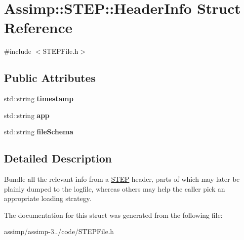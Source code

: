 \hypertarget{struct_assimp_1_1_s_t_e_p_1_1_header_info}{\section{Assimp\+:\+:S\+T\+E\+P\+:\+:Header\+Info Struct Reference}
\label{struct_assimp_1_1_s_t_e_p_1_1_header_info}
}


{\ttfamily \#include $<$S\+T\+E\+P\+File.\+h$>$}

\subsection*{Public Attributes}
\begin{DoxyCompactItemize}
\item 
\hypertarget{struct_assimp_1_1_s_t_e_p_1_1_header_info_a1f8c559854a4c72093288d3a49924643}{std\+::string {\bfseries timestamp}}\label{struct_assimp_1_1_s_t_e_p_1_1_header_info_a1f8c559854a4c72093288d3a49924643}

\item 
\hypertarget{struct_assimp_1_1_s_t_e_p_1_1_header_info_a11cff7415618244f9fd447878db72f6c}{std\+::string {\bfseries app}}\label{struct_assimp_1_1_s_t_e_p_1_1_header_info_a11cff7415618244f9fd447878db72f6c}

\item 
\hypertarget{struct_assimp_1_1_s_t_e_p_1_1_header_info_a7ba02d09159bb581394c6eb671722539}{std\+::string {\bfseries file\+Schema}}\label{struct_assimp_1_1_s_t_e_p_1_1_header_info_a7ba02d09159bb581394c6eb671722539}

\end{DoxyCompactItemize}


\subsection{Detailed Description}
Bundle all the relevant info from a \hyperlink{namespace_assimp_1_1_s_t_e_p}{S\+T\+E\+P} header, parts of which may later be plainly dumped to the logfile, whereas others may help the caller pick an appropriate loading strategy. 

The documentation for this struct was generated from the following file\+:\begin{DoxyCompactItemize}
\item 
assimp/assimp-\/3../code/S\+T\+E\+P\+File.\+h\end{DoxyCompactItemize}
